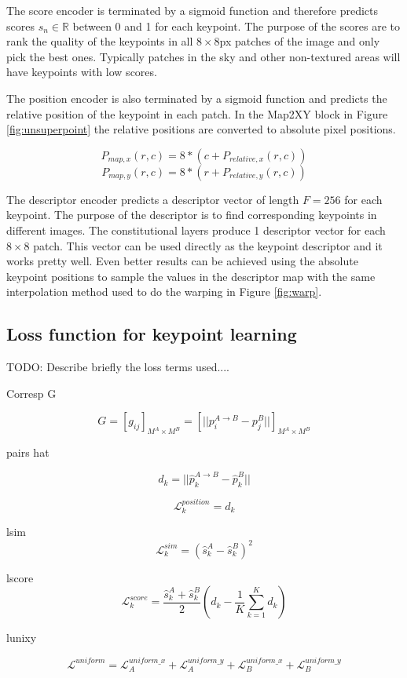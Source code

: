 The score encoder is terminated by a sigmoid function and therefore predicts scores $s_n \in \mathbb{R} $ between 0 and 1 for each keypoint. The purpose of the scores are to rank the quality of the keypoints in all $8\times 8$px patches of the image and only pick the best ones. Typically patches in the sky and other non-textured areas will have keypoints with low scores.

The position encoder is also terminated by a sigmoid function and predicts the relative position of the keypoint in each patch. In the Map2XY block in Figure \ref{fig:unsuperpoint} the relative positions are converted to absolute pixel positions.

\[
P_{map,x}(r,c) = 8 * (c + P_{relative,x}(r,c))
\]
\[
P_{map,y}(r,c) = 8 * (r + P_{relative,y}(r,c))
\]

The descriptor encoder predicts a descriptor vector of length $F=256$ for each keypoint. The purpose of the descriptor is to find corresponding keypoints in different images. The constitutional layers produce 1 descriptor vector for each $8\times 8$ patch. This vector can be used directly as the keypoint descriptor and it works pretty well. Even better results can be achieved using the absolute keypoint positions to sample the values in the descriptor map with the same interpolation method used to do the warping in Figure \ref{fig:warp}.


\subsection{Loss function for keypoint learning}

TODO: Describe briefly the loss terms used....

Corresp G

\[
G=[g_{ij}]_{M^A\times M^B}=\left[||p_i^{A\rightarrow B}-p_j^B||\right]_{M^A\times M^B}
\]

pairs hat

\[
d_k=||\hat{p}_k^{A\rightarrow B}-\hat{p}_k^B||
\]

\[
\mathcal{L}_k^{position} = d_k
\]

lsim
\[
\mathcal{L}_k^{sim} = \left(\hat{s}_k^{A}-\hat{s}_k^B\right)^2
\]

lscore
\[
\mathcal{L}_k^{score}=\frac{\hat{s}_k^A+\hat{s}_k^B}{2}\left(d_k-\frac{1}{K}\sum^K_{k=1}d_k\right)
\]


lunixy

\[
\mathcal{L}^{uniform}=\mathcal{L}^{uniform\_x}_A+\mathcal{L}^{uniform\_y}_A+\mathcal{L}^{uniform\_x}_B+\mathcal{L}^{uniform\_y}_B
\]

